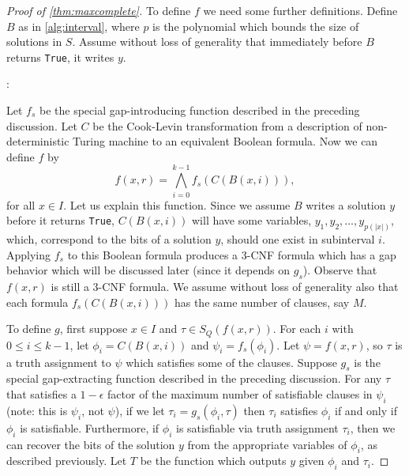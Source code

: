 \documentclass[]{article}
\theoremstyle{plain}
\theoremstyle{definition}
\begin{document}
\begin{proof}[Proof of \autoref{thm:maxcomplete}]
  To define $f$ we need some further definitions.
  Define $B$ as in \autoref{alg:interval}, where $p$ is the polynomial which bounds the size of solutions in $S$.
  Assume without loss of generality that immediately before $B$ returns \texttt{True}, it writes $y$.
  \begin{algorithm}
    \caption{Nondeterministic polynomial time algorithm that decides if there is an approximate solution for instance $x$ of problem $P$ in interval $i$%
      \label{alg:interval}}
    \begin{algorithmic}
      \Statex{}
      :
        \Else
          { }
        \EndIf
      \EndFunction
    \end{algorithmic}
  \end{algorithm}
  Let $f_s$ be the special gap-introducing function described in the preceding discussion.
  Let $C$ be the Cook-Levin transformation from a description of non-deterministic Turing machine to an equivalent Boolean formula.
  Now we can define $f$ by
  \begin{displaymath}
    f(x, r) = \bigwedge_{i = 0}^{k - 1}{f_s(C(B(x, i)))},
  \end{displaymath}
  for all $x \in I$.
  Let us explain this function.
  Since we assume $B$ writes a solution $y$ before it returns \texttt{True}, $C(B(x, i))$ will have some variables, $y_1, y_2, \dotsc, y_{p(|x|)}$, which, correspond to the bits of a solution $y$, should one exist in subinterval $i$.
  Applying $f_s$ to this Boolean formula produces a 3-CNF formula which has a gap behavior which will be discussed later (since it depends on $g_s$).
  Observe that $f(x, r)$ is still a 3-CNF formula.
  We assume without loss of generality also that each formula $f_s(C(B(x, i)))$ has the same number of clauses, say $M$.

  To define $g$, first suppose $x \in I$ and $\tau \in S_Q(f(x, r))$.
  For each $i$ with $0 \leq i \leq k - 1$, let $\phi_i = C(B(x, i))$ and $\psi_i = f_s(\phi_i)$.
  Let $\psi = f(x, r)$, so $\tau$ is a truth assignment to $\psi$ which satisfies some of the clauses.
  Suppose $g_s$ is the special gap-extracting function described in the preceding discussion.
  For any $\tau$ that satisfies a $1 - \epsilon$ factor of the maximum number of satisfiable clauses in $\psi_i$ (note: this is $\psi_i$, not $\psi$), if we let $\tau_i = g_s(\phi_i, \tau)$ then $\tau_i$ satisfies $\phi_i$ if and only if $\phi_i$ is satisfiable.
  Furthermore, if $\phi_i$ is satisfiable via truth assignment $\tau_i$, then we can recover the bits of the solution $y$ from the appropriate variables of $\phi_i$, as described previously.
  Let $T$ be the function which outputs $y$ given $\phi_i$ and $\tau_i$.


\end{proof}
\end{document}
